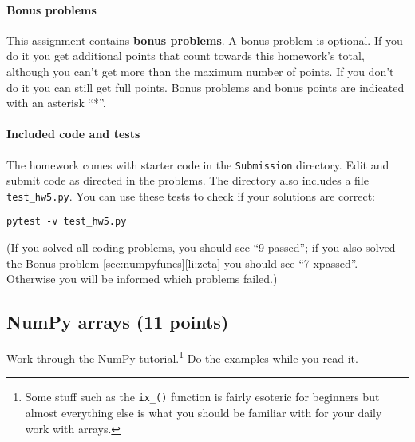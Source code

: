 \documentclass[letterpaper]{scrartcl}
\begin{document}
\paragraph{Bonus problems}

This assignment contains \textbf{bonus problems}. A bonus problem is
optional. If you do it you get additional points that count towards
this homework's total, although you can't get more than the maximum
number of points. If you don't do it you can still get full
points. Bonus problems and bonus points are indicated with an asterisk
``*''.

\paragraph{Included code and tests}

The homework comes with starter code in the \texttt{Submission}
directory. Edit and submit code as directed in the problems. The
directory also includes a file \texttt{test\_hw5.py}. You can use these
tests to check if your solutions are correct:
\begin{verbatim}
pytest -v test_hw5.py
\end{verbatim}
(If you solved all coding problems, you should see ``9 passed''; if
you also solved the Bonus problem \ref{sec:numpyfuncs}\ref{li:zeta}
you should see ``7 xpassed''. Otherwise you will be informed which
problems failed.)


\subsection{NumPy arrays (11 points)}

Work through the
\href{https://docs.scipy.org/doc/numpy-dev/user/quickstart.html}{NumPy
  tutorial}.\footnote{Some stuff such as the \texttt{ix\_()} function
  is fairly esoteric for beginners but almost everything else is what
  you should be familiar with for your daily work with arrays.} Do
the examples while you read it.
\end{document}

